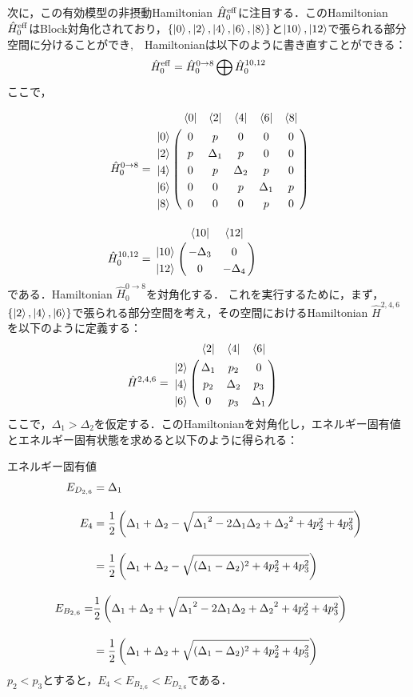 \subsection{}
次に，この有効模型の非摂動Hamiltonian $\hat{H}_0^{\rm{eff}}$に注目する．このHamiltonian $\hat{H}_0^{\rm{eff}}$はBlock対角化されており，$\{\ket{0}, \ket{2}, \ket{4}, \ket{6}, \ket{8}\}$と$\ket{10}, \ket{12}$で張られる部分空間に分けることができ,　Hamiltonianは以下のように書き直すことができる：
\begin{equation}
    \hat{H}_0^{\rm{eff}}
    =\hat{H}_0^{0\to8} \bigoplus \hat{H}_0^{10,12}
\end{equation}
ここで，
    
\begin{align}
    \hat{H}_0^{0\to8}&=\bordermatrix{
    & \bra{0} &  \bra{2} &  \bra{4}&  \bra{6}&  \bra{8}\cr
   \ket{0}&0&p&0&0&0\cr
  \ket{2}&p&\Delta_1&p&0&0\cr
  \ket{4}&0&p&\Delta_2&p&0\cr
  \ket{6}&0&0&p&\Delta_1&p\cr
  \ket{8}&0&0&0&p&0\cr
  }\\[10pt]
  \hat{H}_0^{10,12}&=
   \bordermatrix{     
    & \bra{10} &\bra{12}\cr
   \ket{10}&-\Delta_3&0\cr
  \ket{12}&0&-\Delta_4\cr}
\end{align}
である．Hamiltonian $\hat{H}_0^{0\to8}$を対角化する．
これを実行するために，まず，$\{\ket{2}, \ket{4}, \ket{6}\}$で張られる部分空間を考え，その空間におけるHamiltonian $\hat{H}^{2,4,6}$を以下のように定義する：
\begin{align}
    \hat{H}^{2,4,6}&=\bordermatrix{
    & \bra{2} &  \bra{4}&  \bra{6}\cr
  \ket{2}&\Delta_1&p_2&0\cr
  \ket{4}&p_2&\Delta_2&p_3\cr
  \ket{6}&0&p_3&\Delta_1\cr
  }
\end{align}
ここで，$\Delta_1>\Delta_2$を仮定する．このHamiltonianを対角化し，エネルギー固有値とエネルギー固有状態を求めると以下のように得られる：


エネルギー固有値
\begin{align}
    E_{D_{2,6}}&=
    {\Delta_{1}}\\[10pt]
    E_4&=
    \frac{1}{2}\left({\Delta_{1}}+{\Delta_{2}}-\sqrt{{\Delta_{1}}^2-2{\Delta_{1}}{\Delta_{2}}+{\Delta_{2}}^2+4p_2^2+4p_3^2}\right)\nn[10pt]
    &=\frac{1}{2}\left({\Delta_{1}}+{\Delta_{2}}-\sqrt{{
    (\Delta_{1}}-{\Delta_{2}})^2+4p_2^2+4p_3^2}\right)\\[10pt]
    E_{B_{2,6}}=&\frac{1}{2}\left({\Delta_{1}}+{\Delta_{2}}+\sqrt{{\Delta_{1}}^2-2{\Delta_{1}}{\Delta_{2}}+{\Delta_{2}}^2+4p_2^2+4p_3^2}\right)
    \nn[10pt]
    &=\frac{1}{2}\left({\Delta_{1}}+{\Delta_{2}}
    +\sqrt{{
    (\Delta_{1}}-{\Delta_{2}})^2+4p_2^2+4p_3^2}\right)
\end{align}
$p_2<p_3$とすると，$E_4< E_{B_{2,6}} < E_{D_{2,6}}$である．

